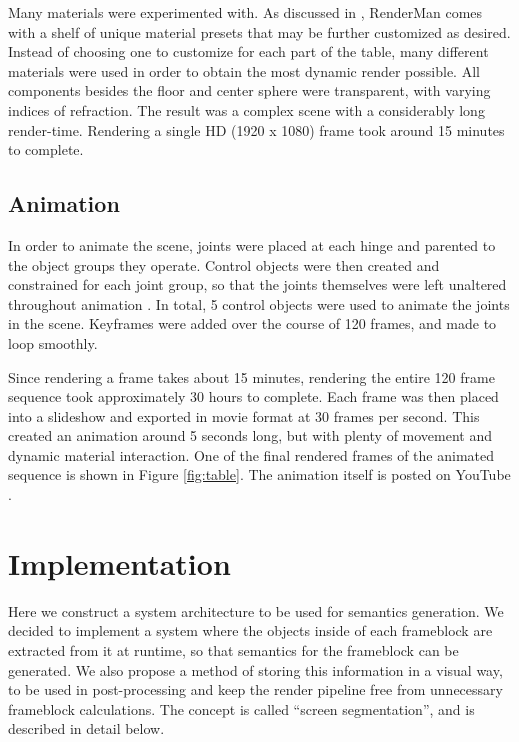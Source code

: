 \documentclass[conference]{IEEEtran}
\begin{document}
Many materials were experimented with. As discussed in \cite{renderman},
RenderMan comes with a shelf of unique material presets that may be further customized as desired.
Instead of choosing one to customize for each part of the table,
many different materials were used in order to obtain the most dynamic render possible.
All components besides the floor and center sphere were transparent, with varying indices of refraction.
The result was a complex scene with a considerably long render-time.
Rendering a single HD (1920 x 1080) frame took around 15 minutes to complete.

\subsection{Animation}
In order to animate the scene, joints were placed at each hinge and parented to the object groups they operate.
Control objects were then created and constrained for each joint group,
so that the joints themselves were left unaltered throughout animation \cite{rigging}.
In total, 5 control objects were used to animate the joints in the scene.
Keyframes were added over the course of 120 frames, and made to loop smoothly.

Since rendering a frame takes about 15 minutes,
rendering the entire 120 frame sequence took approximately 30 hours to complete.
Each frame was then placed into a slideshow and exported in movie format at 30 frames per second.
This created an animation around 5 seconds long,
but with plenty of movement and dynamic material interaction.
One of the final rendered frames of the animated sequence is shown in Figure \ref{fig:table}.
The animation itself is posted on YouTube \cite{animation}.

\section{Implementation}
Here we construct a system architecture to be used for semantics generation.
We decided to implement a system where the objects inside of each frameblock
are extracted from it at runtime, so that semantics for the frameblock
can be generated. We also propose a method of storing this information
in a visual way, to be used in post-processing and keep the render pipeline free from
unnecessary frameblock calculations.
The concept is called ``screen segmentation'', and is described
in detail below.
\end{document}
